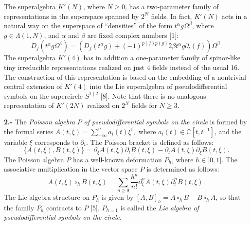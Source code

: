 \documentclass[a4paper,a4paper]{article}
\begin{document}
The superalgebra $K'(N)$, where $N \geq 0$,
has a two-parameter family of representations in the superspace 
spanned by $2^N$ fields. In fact, $K'(N)$ acts in a natural way
on the superspace of ``densities'' of the form
$t^{\alpha}g\Omega^{\beta}$, where $g\in  \Lambda(1, N)$, and
$\alpha$ and $\beta$ are fixed
complex numbers [1]:
\begin{equation}
D_f(t^{\alpha}g\Omega^{\beta}) =
(D_f(t^{\alpha}g) + (-1)^{p(f)p(g)}2\beta t^{\alpha}g\partial_t(f))
\Omega^{\beta}.
\end{equation}
The superalgebra $K'(4)$ has in addition a one-parameter family of spinor-like tiny
irreducible representations realized on just 4 fields instead of the
usual 16. The construction of this representation is based on the
embedding of a nontrivial central extension 
of  ${K}'(4)$ into the Lie superalgebra of pseudodifferential symbols on
the supercircle   $S^{1\mid 2}$ [8]. Note that there is no analogous
representation of $K'(2N)$ realized on $2^N$ fields for $N \geq 3$.

{\bf 2.-}  
The {\it Poisson algebra} $P$ {\it of pseudodifferential symbols
on the circle} is formed by the formal series
$A(t, \xi) = \sum_{-\infty}^na_i(t) {\xi}^i,$
where $a_i(t)\in \mathbb C [t, t^{-1}]$, and the variable $\xi$ corresponds
to $\partial_t$. 
The Poisson bracket is defined as follows:
\begin{equation}
\lbrace A(t, \xi), B(t, \xi) \rbrace = 
\partial_{\xi}A(t, \xi)\partial_{t}B(t, \xi) -
\partial_tA(t, \xi)\partial_{\xi}B(t, \xi).
\end{equation}
The Poisson algebra $P$ has a well-known deformation $P_h$,
where $h\in \rbrack 0, 1]$.
The associative multiplication in the vector space $P$
is determined as follows:
\begin{equation}
A(t, \xi)\circ_h B(t, \xi) = 
\sum_{n\geq 0}\frac {h^n} {n!}\partial^n_{\xi}A(t, \xi)
\partial^n_{t}B(t, \xi). 
\end{equation}
The Lie algebra structure on $P_h$ is given by
$[A, B]_h =  A\circ_h B - B\circ_h A$, so that the family
$P_h$ contracts to $P$ [5]. $P_{h=1}$ is called 
the  {\it Lie algebra of pseudodifferential symbols
on the circle}.
\end{document}
